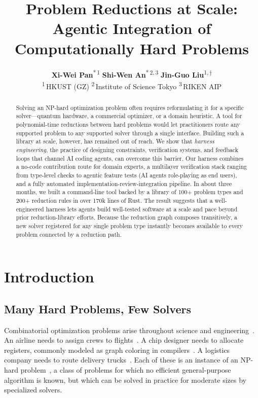 \documentclass{article}
\title{Problem Reductions at Scale: Agentic Integration of Computationally Hard Problems}
\author{%
  \textbf{Xi-Wei Pan}\textsuperscript{*\,1} \quad
  \textbf{Shi-Wen An}\textsuperscript{*\,2,\,3} \quad
  \textbf{Jin-Guo Liu}\textsuperscript{1,\,$\dagger$} \\[2pt]
  \textsuperscript{1}\,HKUST (GZ) \quad
  \textsuperscript{2}\,Institute of Science Tokyo \quad
  \textsuperscript{3}\,RIKEN AIP
}
\begin{document}
\maketitle


\begin{abstract}
  Solving an NP-hard optimization problem often requires reformulating it for a specific solver---quantum hardware, a commercial optimizer, or a domain heuristic.
  A tool for polynomial-time reductions between hard problems would let practitioners route any supported problem to any supported solver through a single interface.
  Building such a library at scale, however, has remained out of reach.
  We show that \emph{harness engineering}, the practice of designing constraints, verification systems, and feedback loops that channel AI coding agents, can overcome this barrier.
  Our harness combines a no-code contribution route for domain experts, a multilayer verification stack ranging from type-level checks to agentic feature tests (AI agents role-playing as end users), and a fully automated implementation-review-integration pipeline.
  In about three months, we built a command-line tool backed by a library of 100+ problem types and 200+ reduction rules in over 170k lines of Rust.
  The result suggests that a well-engineered harness lets agents build well-tested software at a scale and pace beyond prior reduction-library efforts.
  Because the reduction graph composes transitively, a new solver registered for any single problem type instantly becomes available to every problem connected by a reduction path.
\end{abstract}



\section{Introduction}\label{sec:intro}

\subsection{Many Hard Problems, Few Solvers}

Combinatorial optimization problems arise throughout science and engineering~\cite{korte2008combinatorial,Schuetz2022PhysicsGNN}.
An airline needs to assign crews to flights~\cite{gopalakrishnan2005airline}.
A chip designer needs to allocate registers, commonly modeled as graph coloring in compilers~\cite{chaitin1981register}.
A logistics company needs to route delivery trucks~\cite{toth2014vehicle}.
Each of these is an instance of an NP-hard problem~\cite{karp1972,garey1979}, a class of problems for which no efficient general-purpose algorithm is known, but which can be solved in practice for moderate sizes by specialized solvers.
\end{document}
